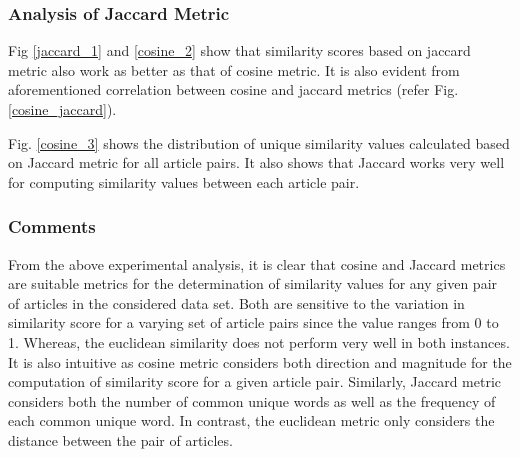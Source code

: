 \documentclass[journal,onecolumn]{IEEEtran}
\begin{document}

\subsubsection{ \textbf{Analysis of Jaccard Metric}}
Fig \ref{jaccard_1} and \ref{cosine_2} show that similarity scores based on jaccard metric also work as better as that of cosine metric. It is also evident from aforementioned correlation between cosine and jaccard metrics (refer Fig. \ref{cosine_jaccard}).

Fig. \ref{cosine_3} shows the distribution of unique similarity values calculated based on Jaccard metric for all article pairs. It also shows that Jaccard works very well for computing similarity values between each article pair.


\subsubsection{\textbf{Comments}} From the above experimental analysis, it is clear that cosine and Jaccard metrics are suitable metrics for the determination of similarity values for any given pair of articles in the considered data set. Both are sensitive to the variation in similarity score for a varying set of article pairs since the value ranges from 0 to 1. Whereas, the euclidean similarity does not perform very well in both instances. It is also intuitive as cosine metric considers both direction and magnitude for the computation of similarity score for a given article pair. Similarly, Jaccard metric considers both the number of common unique words as well as the frequency of each common unique word.  In contrast, the euclidean metric only considers the distance between the pair of articles. 
\end{document}
